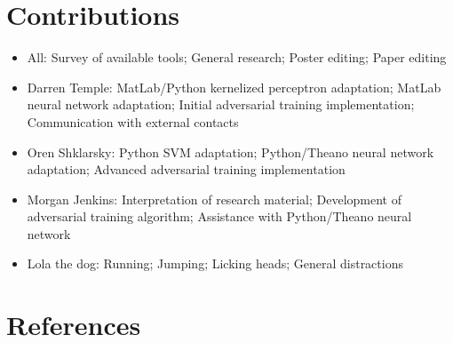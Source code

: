 \documentclass{article} %
\begin{document}
\section*{Contributions}
\label{sec:contributions}

\begin{itemize}
\item All: Survey of available tools; General research; Poster editing; Paper editing
\item Darren Temple: MatLab/Python kernelized perceptron adaptation; MatLab neural network adaptation; Initial adversarial training implementation; Communication with external contacts
\item Oren Shklarsky: Python SVM adaptation; Python/Theano neural network adaptation; Advanced adversarial training implementation
\item Morgan Jenkins: Interpretation of research material; Development of adversarial training algorithm; Assistance with Python/Theano neural network
\item Lola the dog: Running; Jumping; Licking heads; General distractions
\end{itemize}


\section*{References}
\label{sec:references}



\end{document}
